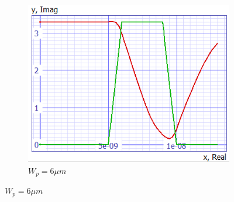 \documentclass[../main.tex]{subfiles}
\begin{document}
{{\begin{figure}[H]
\begin{subfigure}{0.3\textwidth}
					\centering
					\includegraphics[width=\textwidth]{plots/Q6_05pf.png}
					\caption{$W_p = 6\mu m$}
					\label{fig:subfig3}
				\end{subfigure}
				

\end{figure}}}
\end{document}

